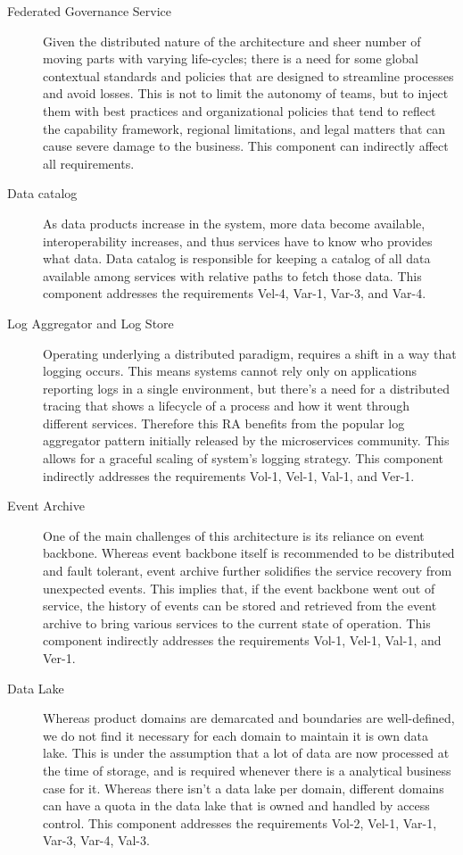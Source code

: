 \documentclass[a4paper,11pt]{article}
\begin{document}
\begin{description}
    \item[Federated Governance Service] Given the distributed nature of the architecture and sheer number of moving parts with varying life-cycles; there is a need for some global contextual standards and policies that are designed to streamline processes and avoid losses. This is not to limit the autonomy of teams, but to inject them with best practices and organizational policies that tend to reflect the capability framework, regional limitations, and legal matters that can cause severe damage to the business. This component can indirectly affect all requirements.
    
    \item[Data catalog] As data products increase in the system, more data become available, interoperability increases, and thus services have to know who provides what data. Data catalog is responsible for keeping a catalog of all data available among services with relative paths to fetch those data. This component addresses the requirements Vel-4, Var-1, Var-3, and Var-4.

    \item[Log Aggregator and Log Store] Operating underlying a distributed paradigm, requires a shift in a way that logging occurs. This means systems cannot rely only on applications reporting logs in a single environment, but there's a need for a distributed tracing that shows a lifecycle of a process and how it went through different services. Therefore this RA benefits from the popular log aggregator pattern initially released by the microservices community. This allows for a graceful scaling of system's logging strategy. This component indirectly addresses the requirements Vol-1, Vel-1, Val-1, and Ver-1. 
    
    \item[Event Archive] One of the main challenges of this architecture is its reliance on event backbone. Whereas event backbone itself is recommended to be distributed and fault tolerant, event archive further solidifies the service recovery from unexpected events. This implies that, if the event backbone went out of service, the history of events can be stored and retrieved from the event archive to bring various services to the current state of operation. This component indirectly addresses the requirements Vol-1, Vel-1, Val-1, and Ver-1. 

    \item[Data Lake] Whereas product domains are demarcated and boundaries are well-defined, we do not find it necessary for each domain to maintain it is own data lake. This is under the assumption that a lot of data are now processed at the time of storage, and is required whenever there is a analytical business case for it. Whereas there isn't a data lake per domain, different domains can have a quota in the data lake that is owned and handled by access control. This component addresses the requirements Vol-2, Vel-1, Var-1, Var-3, Var-4, Val-3.
    

\end{description}
\end{document}
